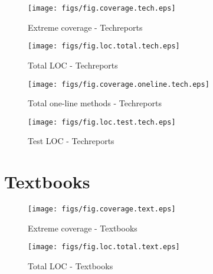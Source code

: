 \begin{figure}[htbp]
  \begin{minipage}[htbp]{.45\linewidth}
    \begin{center}
      \texttt{[image: figs/fig.coverage.tech.eps]}
      \caption{Extreme coverage - Techreports}
      \label{fig:coverage.tech}
    \end{center}
  \end{minipage}
\hfill
  \begin{minipage}[htbp]{.45\linewidth}
    \begin{center}
      \texttt{[image: figs/fig.loc.total.tech.eps]}
      \caption{Total LOC - Techreports}
      \label{fig:loc.total.tech}
    \end{center}
  \end{minipage}
\end{figure}

\begin{figure}[htbp]
  \begin{minipage}[htbp]{.45\linewidth}
    \begin{center}
      \texttt{[image: figs/fig.coverage.oneline.tech.eps]}
      \caption{Total one-line methods - Techreports}
      \label{fig:coverage.oneline.test.tech}
    \end{center}
  \end{minipage}
\hfill
  \begin{minipage}[htbp]{.45\linewidth}
    \begin{center}
      \texttt{[image: figs/fig.loc.test.tech.eps]}
      \caption{Test LOC - Techreports}
      \label{fig:loc.test.tech}
    \end{center}
  \end{minipage}
\end{figure}

\clearpage


\section {Textbooks}

\begin{figure}[htbp]
  \begin{minipage}[htbp]{.45\linewidth}
    \begin{center}
      \texttt{[image: figs/fig.coverage.text.eps]}
      \caption{Extreme coverage - Textbooks}
      \label{fig:coverage.text}
    \end{center}
  \end{minipage}
\hfill
  \begin{minipage}[htbp]{.45\linewidth}
    \begin{center}
      \texttt{[image: figs/fig.loc.total.text.eps]}
      \caption{Total LOC - Textbooks}
      \label{fig:loc.total.text}
    \end{center}
  \end{minipage}
\end{figure}

